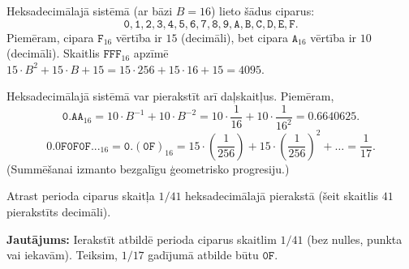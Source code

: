 \documentclass[a4paper,12pt]{article}
\newcommand\answer[1]{}
\begin{document}
\vspace{10pt}
\begin{problem}
Heksadecimālajā sistēmā (ar bāzi $B=16$) lieto šādus ciparus:
\[ \mathtt{0},\mathtt{1},\mathtt{2},\mathtt{3},\mathtt{4},\mathtt{5},\mathtt{6},\mathtt{7},\mathtt{8},
\mathtt{9},\mathtt{A},\mathtt{B},\mathtt{C},\mathtt{D},\mathtt{E},\mathtt{F}. \]
Piemēram, cipara $\mathtt{F}_{16}$ vērtība ir $15$ (decimāli),
bet cipara $\mathtt{A}_{16}$ vērtība ir $10$ (decimāli).
Skaitlis $\mathtt{FFF}_{16}$ apzīmē $15 \cdot B^2 + 15 \cdot B + 15 = 15 \cdot 256+15 \cdot 16+15=4095$.

Heksadecimālajā sistēmā var pierakstīt arī daļskaitļus. Piemēram,
\[ \mathtt{0.AA}_{16} = 10 \cdot B^{-1} + 10 \cdot B^{-2}=10 \cdot \frac{1}{16} + 10 \cdot \frac{1}{16^2} = 0.6640625. \]
\[ \mathtt{0.0F0F0F...}_{16}=\mathtt{0.(0F)}_{16} = 15 \cdot \left( \frac{1}{256} \right) +15 \cdot \left( \frac{1}{256} \right)^2+ \ldots= \frac{1}{17}. \]
(Summēšanai izmanto bezgalīgu ģeometrisko progresiju.)

Atrast perioda ciparus skaitļa $1/41$ heksadecimālajā pierakstā (šeit skaitlis $41$ pierakstīts decimāli).

{\bf Jautājums:} Ierakstīt atbildē perioda ciparus skaitlim $1/41$ (bez nulles, punkta vai iekavām).
Teiksim, $1/17$ gadījumā atbilde būtu $\mathtt{0F}$.
\answer{

{\bf Atbilde.} $\mathtt{063E7}$

Iepriekšējā jautājumā jau noskaidrojām, ka $16^5 - 1 = 1048575$ dalās ar $41$; dalīšanas rezultāts ir 
$(16^5 - 1)/41 = 25575$. Tāpēc
\[ \frac{1}{41} = \frac{25575}{1048575} = 25575 \cdot \frac{1}{16^5 - 1} = 
25575 \cdot \left( \frac{1}{16^5} + \frac{1}{16^{10}} + \frac{1}{16^{15}} + \frac{1}{16^{20}} + \ldots \right). \]
Pēdējā vienādība seko no bezgalīgas ģeometriskas progresijas summas formulas.

Pārveidojam šo daļu heksadecimālajā skaitīšanas sistēmā:
\begin{equation}
\label{eq:infinite-hex}
\frac{1}{1048575} = 0.000010000100001\ldots_{16}.
\end{equation}
Pārveidojam $25575_{10}$ par heksadecimālu skaitli, atkārtoti dalot ar $16$:
\[
\begin{array}{l}
25575 = 1598 \cdot 16 + 7,\\
1598 = 99 \cdot 16 + 14,\\
99 = 6 \cdot 16 + 3,\\
6 = 0 \cdot 16 + 6.\\
\end{array}
\] 
Tāpēc $25575_{10} = \mathtt{063E7}_{16}$. Tagad reizinām to ar (\ref{eq:infinite-hex})
(jeb dalām ar $1048575$ lai iegūtu precīzi $\frac{1}{41}$). Iegūstam:
\[ \frac{25575}{1048575} = \frac{1}{41} = \mathtt{0.063E7063E7063E7...}_{16} = \mathtt{0.(063E7)}_{16}. \]

}
\end{problem}
\end{document}
